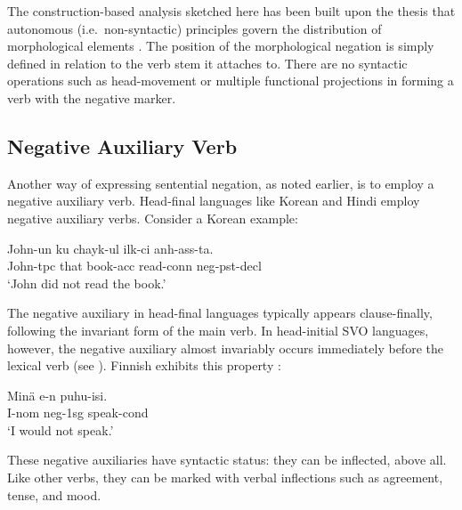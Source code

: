 \documentclass[output=paper]{langsci/langscibook}
\begin{document}
{The construction-based analysis sketched here
  has been built upon the
thesis that autonomous (i.e.\ non-syntactic) principles govern the
distribution of morphological elements \citet{BM:95}.
The position of the morphological negation is simply
defined in relation to
the verb stem it attaches to. There are no syntactic operations such
as head-movement or multiple functional projections in forming
a verb with the negative marker.



\subsection{Negative Auxiliary Verb}

Another way of expressing sentential negation, as noted earlier, is to employ
a negative auxiliary
verb. Head-final languages like Korean and Hindi employ
negative auxiliary verbs. Consider a Korean example:

%



\ea
\gll John-un ku chayk-ul ilk-ci anh-ass-ta. \\
     John-{\sc tpc} that book-{\sc acc} read-{\sc conn} {\sc neg}-{\sc pst}-{\sc decl}  \\
\glt `John did not read the book.'
\z

\noindent
The negative auxiliary in head-final languages
typically appears
clause-finally, following the invariant form of the main verb.
In head-initial SVO languages, however, the negative auxiliary
almost invariably occurs immediately before the lexical verb
(see \citet{Payne:85}). Finnish exhibits this property \citep{Mitchell:91}:

\ea
\gll Min\"{a} e-n puhu-isi. \\
     I-{\sc nom} {\sc neg}-{\sc 1sg} speak-{\sc cond} \\
\glt `I would not speak.'
\z


\noindent
These negative auxiliaries have syntactic status: they can be
inflected, above all. Like other verbs, they can be marked
with verbal inflections such as agreement, tense, and mood.

}
\end{document}
